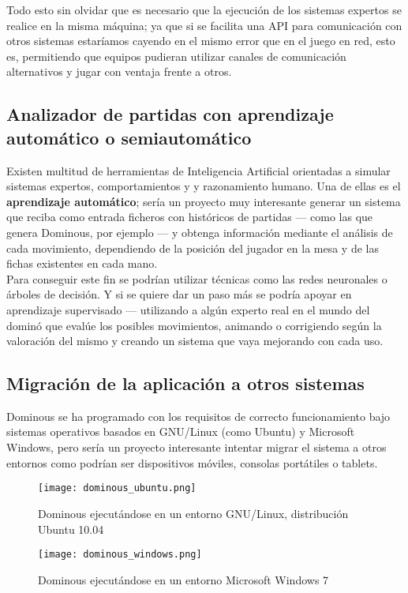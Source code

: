 Todo esto sin olvidar que es necesario que la ejecución de los sistemas expertos se realice en la misma máquina; ya que
si se facilita una API para comunicación con otros sistemas estaríamos cayendo en el mismo error que en el juego en red, 
esto es, permitiendo que equipos pudieran utilizar canales de comunicación alternativos y jugar con ventaja frente a otros.

\subsection{Analizador de partidas con aprendizaje automático o semiautomático}

Existen multitud de herramientas de Inteligencia Artificial orientadas a simular sistemas expertos, comportamientos y 
y razonamiento humano. Una de ellas es el \textbf{aprendizaje automático}; sería un proyecto muy interesante generar un sistema
que reciba como entrada ficheros con históricos de partidas --- como las que genera Dominous, por ejemplo --- y obtenga
información mediante el análisis de cada movimiento, dependiendo de la posición del jugador en la mesa y de las fichas
existentes en cada mano. \\

Para conseguir este fin se podrían utilizar técnicas como las redes neuronales o árboles de decisión. Y si se quiere
dar un paso más se podría apoyar en aprendizaje supervisado --- utilizando a algún experto real en el mundo del dominó
que evalúe los posibles movimientos, animando o corrigiendo según la valoración del mismo y creando un sistema que
vaya mejorando con cada uso.

\subsection{Migración de la aplicación a otros sistemas}

Dominous se ha programado con los requisitos de correcto funcionamiento bajo sistemas operativos basados en GNU/Linux (como
Ubuntu) y Microsoft Windows, pero sería un proyecto interesante intentar migrar el sistema a otros entornos como podrían ser
dispositivos móviles, consolas portátiles o tablets. \\

\begin{figure}[h]
  \begin{center}
    \texttt{[image: dominous\_ubuntu.png]}
  \end{center}
  \caption{Dominous ejecutándose en un entorno GNU/Linux, distribución Ubuntu 10.04}
  \label{dominous_ubuntu}
\end{figure}


\begin{figure}[h]
  \begin{center}
    \texttt{[image: dominous\_windows.png]}
  \end{center}
  \caption{Dominous ejecutándose en un entorno Microsoft Windows 7}
  \label{dominous_windows}
\end{figure}

